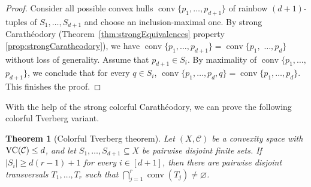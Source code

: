 \documentclass[11pt]{article}
\newtheorem{thm}{Theorem}[section]%
\theoremstyle{definition}
\newcommand{\C}{\mathcal{C}}
\newcommand{\conv}{\operatorname{conv}}
\newcommand{\VC}{\textup{VC}}
\newcommand{\size}[1]{\left| #1 \right|}
\begin{document}
\begin{proof}
    Consider all possible convex hulls $\conv \{p_1, \ldots, p_{d+1}\}$ of rainbow $(d+1)$-tuples of $S_1, \ldots, S_{d+1}$ and choose an inclusion-maximal one.
    By strong Carath\'eodory (Theorem~\ref{thm:strongEquivalences} property \ref{prop:strongCaratheodory}), we have $\conv \{p_1, \ldots, p_{d+1}\} = \conv \{p_1,$ $ \ldots, p_d\}$ without loss of generality.
    Assume that $p_{d+1} \in S_i$.
    By maximality of $\conv \{p_1, \ldots,$ $p_{d+1}\}$, we conclude that for every $q \in S_i$, $\conv \{p_1, \ldots, p_d, q\} = \conv \{p_1, \ldots, p_d\}$. This finishes the proof.
\end{proof}

With the help of the strong colorful Carath\'eodory, we can prove the following colorful Tverberg variant.

\begin{thm}[Colorful Tverberg theorem]\label{t:colorfulTverberg}
Let $(X,\C)$ be a convexity space with $\VC(\C)\le d$, and let $S_1,\ldots,S_{d+1}\subseteq X$ be pairwise disjoint finite sets. If
$|S_i|\ge d(r-1)+1$
for every $i\in[d+1]$, then there are pairwise disjoint transversals $T_1,\ldots,T_r$ such that $\bigcap_{j=1}^r\conv(T_j)\ne\varnothing$.
\end{thm}
\end{document}
